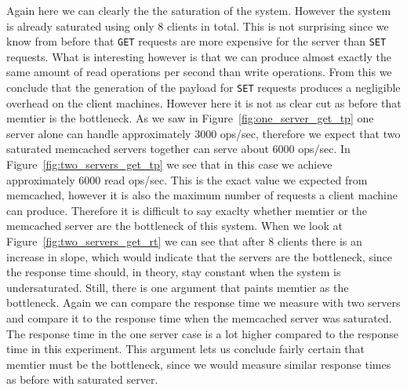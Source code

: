 \documentclass[11pt,a4paper]{article}
\begin{document}
%
Again here we can clearly the the saturation of the system.
%
However the system is already saturated using only 8 clients in total.
%
This is not surprising since we know from before that \texttt{GET} requests are more expensive for the server than \texttt{SET} requests.
%
What is interesting however is that we can produce almost exactly the same amount of read operations per second than write operations. 
%
From this we conclude that the generation of the payload for \texttt{SET} requests produces a negligible overhead on the client machines.
%
However here it is not as clear cut as before that memtier is the bottleneck.
%
As we saw in Figure~\ref{fig:one_server_get_tp} one server alone can handle approximately 3000 ops/sec, therefore we expect that two saturated memcached servers together can serve about 6000 ops/sec.
%
In Figure~\ref{fig:two_servers_get_tp} we see that in this case we achieve approximately 6000 read ops/sec.
%
This is the exact value we expected from memcached, however it is also the maximum number of requests a client machine can produce.
%
Therefore it is difficult to say exaclty whether memtier or the memcached server are the bottleneck of this system.
%
When we look at Figure~\ref{fig:two_servers_get_rt} we can see that after 8 clients there is an increase in slope, which would indicate that the servers are the bottleneck, since the response time should, in theory, stay constant when the system is undersaturated.
%
Still, there is one argument that paints memtier as the bottleneck.
%
Again we can compare the response time we measure with two servers and compare it to the response time when the memcached server was saturated.
%
The response time in the one server case is a lot higher compared to the response time in this experiment. 
%
This argument lets us conclude fairly certain that memtier must be the bottleneck, since we would measure similar response times as before with saturated server.
%
\end{document}
